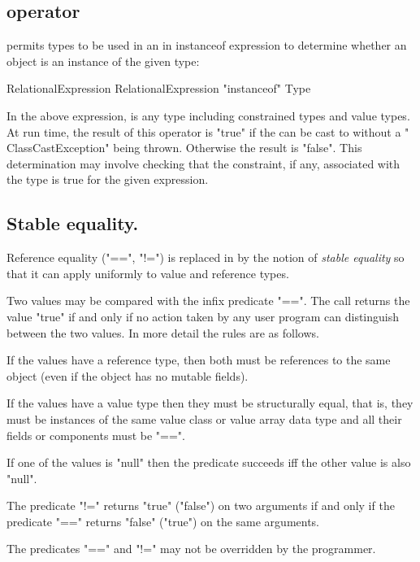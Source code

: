 \subsection{ operator}\label{instanceOf}

\Xten{} permits types to be used in an in instanceof expression
to determine whether an object is an instance of the given type:

\begin{grammar}
RelationalExpression \: RelationalExpression \xcd"instanceof" Type
\end{grammar}

In the above expression,  is any type including
constrained types and value types. 
At run time, the result of this operator is
\xcd"true" if the  can be cast
to  without a \xcd" ClassCastException" being
thrown.  Otherwise the result is \xcd"false".
This determination may involve checking
that the
constraint, if any, associated with the type is true for the
given expression.


\subsection{Stable equality.}\label{StableEquality}\index{==}\index{!=}

Reference equality (\xcd"==", \xcd"!=") is replaced in \Xten{} by the
notion of {\em stable equality} so that it can apply uniformly to value and
reference types.

Two values may be compared with the infix predicate \xcd"==". The call
returns the value \xcd"true" if and only if no action taken by any
user program can distinguish between the two values.  In more detail
the rules are as follows.

If the values have a reference type, then both must be references to
the same object (even if the object has no mutable fields). 

If the values have a value type then they must be structurally equal,
that is, they must be instances of the same value class or value array
data type and all their fields or components must be \xcd"==". 

If one of the values is \xcd"null" then the predicate succeeds iff the
other value is also \xcd"null".

The predicate \xcd"!=" returns \xcd"true" (\xcd"false") on two
arguments if and only if the predicate \xcd"==" returns \xcd"false"
(\xcd"true") on the same arguments.

The predicates \xcd"==" and \xcd"!=" may not be overridden by the
programmer.

